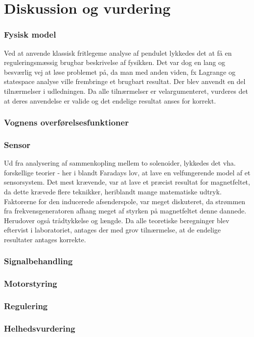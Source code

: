 \chapter{Diskussion og vurdering}\label{kap:diskussion}

\subsection{Fysisk model}
Ved at anvende klassisk fritlegeme analyse af pendulet lykkedes det at få en reguleringsmæssig brugbar beskrivelse af fysikken. 
Det var dog en lang og besværlig vej at løse problemet på, da man med anden viden, fx Lagrange og statespace analyse ville frembringe et brugbart resultat.
Der blev anvendt en del tilnærmelser i udledningen. 
Da alle tilnærmelser er velargumenteret, vurderes det at deres anvendelse er valide og det endelige resultat anses for korrekt.   

\subsection{Vognens overførelsesfunktioner}

\subsection{Sensor}
Ud fra analysering af sammenkopling mellem to solenoider, lykkedes det vha. forskellige teorier - her i blandt Faradays lov, at lave en velfungerende model af et sensorsystem. 
Det mest krævende, var at lave et præcist resultat for magnetfeltet, da dette krævede flere teknikker, heriblandt mange matematiske udtryk.
Faktorerne for den inducerede afsenderspole, var meget diskuteret, da strømmen fra frekvensgeneratoren afhang meget af styrken på magnetfeltet denne dannede.
Herudover også trådtykkelse og længde. 
Da alle teoretiske beregninger blev eftervist i laboratoriet, antages der med grov tilnærmelse, at de endelige resultater antages korrekte.




\subsection{Signalbehandling}

\subsection{Motorstyring}

\subsection{Regulering}

\subsection{Helhedsvurdering}

